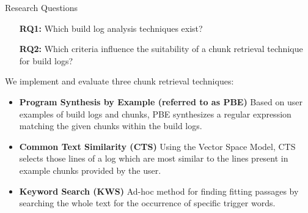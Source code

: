 \begin{simplebox}{Research Questions}
\begin{itemize}
  \item[\textbf{RQ1:}] Which build log analysis techniques exist?
  \item[\textbf{RQ2:}] Which criteria influence the suitability of a chunk
  retrieval technique for build logs?
\end{itemize}
\end{simplebox}



We implement and evaluate three chunk retrieval techniques:
\begin{itemize}
  \item \textbf{Program Synthesis by Example (referred to as PBE)}
  Based on user examples of build logs and chunks, PBE
  synthesizes
  a regular expression matching the given chunks within the build logs.
  \item \textbf{Common Text Similarity (CTS)}
  Using the Vector Space Model, CTS selects those lines of a log which are
  most similar to the lines present in example chunks provided by
  the user.
  \item \textbf{Keyword Search (KWS)}
  Ad-hoc method for finding fitting passages by searching the whole
  text for
  the occurrence of specific trigger words.
\end{itemize}

